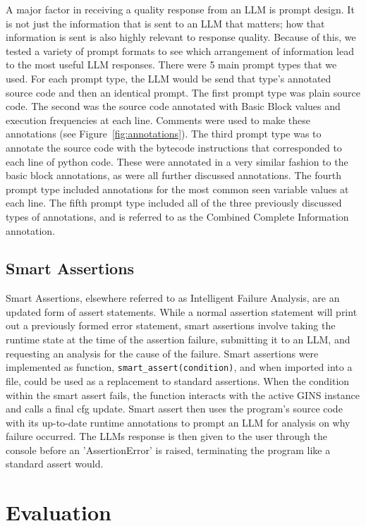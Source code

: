\documentclass[sigconf,nonacm]{acmart}
\begin{document}
A major factor in receiving a quality response from an LLM is prompt design.
It is not just the information that is sent to an LLM that matters; how that information is sent is also highly relevant to response quality.
Because of this, we tested a variety of prompt formats to see which arrangement of information lead to the most useful LLM responses.
There were 5 main prompt types that we used.
For each prompt type, the LLM would be send that type's annotated source code and then an identical prompt.
The first prompt type was plain source code.
The second was the source code annotated with Basic Block values and execution frequencies at each line.
Comments were used to make these annotations (see Figure~\ref{fig:annotations}).
The third prompt type was to annotate the source code with the bytecode instructions that corresponded to each line of python code.
These were annotated in a very similar fashion to the basic block annotations, as were all further discussed annotations.
The fourth prompt type included annotations for the most common seen variable values at each line.
The fifth prompt type included all of the three previously discussed types of annotations, and is referred to as the Combined Complete Information annotation.

\subsection{Smart Assertions}
Smart Assertions, elsewhere referred to as Intelligent Failure Analysis, are an updated form of assert statements.
While a normal assertion statement will print out a previously formed error statement, smart assertions involve taking the runtime state at the time of the assertion failure, submitting it to an LLM, and requesting an analysis for the cause of the failure.
Smart assertions were implemented as function, \texttt{smart\_assert(condition)}, and when imported into a file, could be used as a replacement to standard assertions. When the condition within the smart assert fails, the function interacts with the active GINS instance and calls a final cfg update.
Smart assert then uses the program's source code with its up-to-date runtime annotations to prompt an LLM for analysis on why failure occurred.
The LLMs response is then given to the user through the console before an 'AssertionError' is raised, terminating the program like a standard assert would.

\section{Evaluation}
\end{document}

